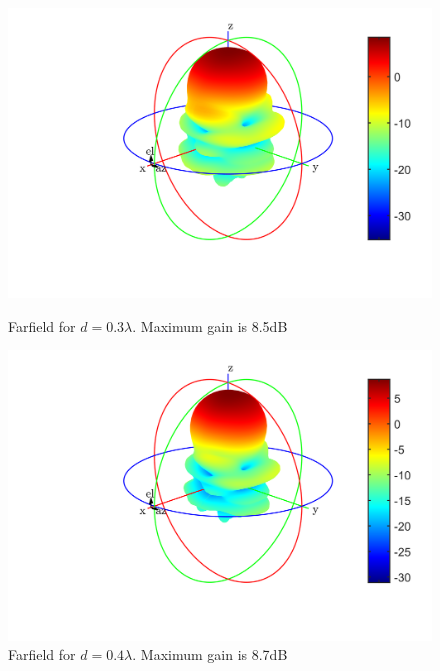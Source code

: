 \begin{figure}[H]
  \centering
  \begin{minipage}[b]{0.5\textwidth}
	\includegraphics[scale = 0.5]{figures/measurement/antennas/array_2_0p3.png}
	\caption{Farfield for $d = 0.3\lambda$. Maximum gain is 8.5dB}
    \label{fig:chamber_two_ant_ff_03}
  \end{minipage}
  \hfill
  \begin{minipage}[b]{0.4\textwidth}
\includegraphics[scale = 0.5]{figures/measurement/antennas/array_2_0p4.png}
\caption{Farfield for $d = 0.4\lambda$. Maximum gain is 8.7dB}
    \label{fig:chamber_two_ant_ff:04}
  \end{minipage}
\end{figure}

